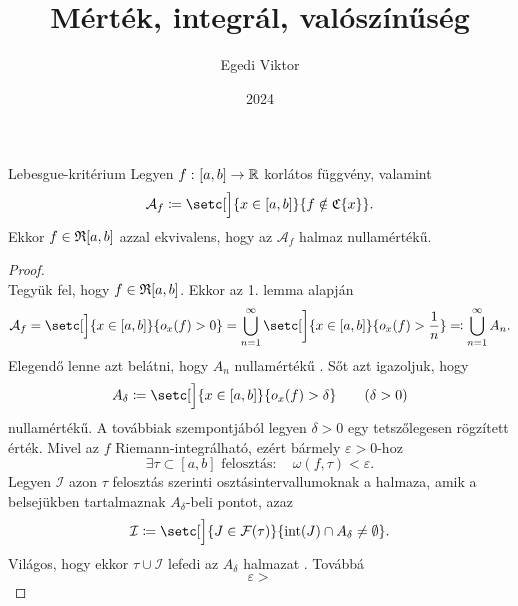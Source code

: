 \documentclass[
]{elteikthesis}[2024/04/26]
\title{Mérték, integrál, valószínűség} %
\date{2024} %
\author{Egedi Viktor}
\affiliation{egyetemi tanár} %
\begin{document}
	
	
	\begin{theorem}{Lebesgue-kritérium}{}
		Legyen \( f \,\colon [a, b] \to \mathbb{R} \) korlátos függvény, valamint
		\[
			\mathcal{A}_f \coloneq \setc[\Big]{ x \in [a, b] }{ f \notin \ContAt{x} }.
		\]
		Ekkor \( f \in \mathfrak{R}{[a, b]} \) azzal ekvivalens, 
		hogy az \( \mathcal{A}_f \) halmaz nullamértékű.
	\end{theorem}
	\begin{proof}\,\\[6pt]
		\Ifstep
		Tegyük fel, hogy \( f \in \mathfrak{R}{[a,b]} \). Ekkor az 1. lemma alapján
		\[
			\mathcal{A}_f = 
			\setc[\Big]{ x \in [a, b] }{ o_x(f) > 0 } =
			\bigcup_{n = 1}^{\infty} \setc[\bigg]{ x \in [a, b] }{ o_x(f) > \frac{1}{n} }
			\eqcolon \bigcup_{n = 1}^{\infty} A_n.
		\]
		Elegendő lenne azt belátni, hogy \( A_n \) nullamértékű%
		.
		Sőt azt igazoljuk, hogy
		\[
			A_\delta \coloneq \setc[\Big]{ x \in [a, b] }{ o_x(f) > \delta }
			\qquad (\delta > 0)
		\]
		nullamértékű. 
		A továbbiak szempontjából legyen \( \delta > 0 \) egy tetszőlegesen rögzített érték.
		Mivel az \( f \) Riemann-integrálható, ezért bármely \( \varepsilon > 0 \)-hoz
		\[
			\exists \tau \subset [a, b] \text{ felosztás} \colon \quad
			\omega(f, \tau) < \varepsilon.
		\]
		Legyen \( \mathcal{I} \) azon \( \tau \) felosztás szerinti osztásintervallumoknak a halmaza, amik a belsejükben tartalmaznak \( A_\delta \)-beli pontot, azaz
		\[
			\mathcal{I} \coloneq
			\setc[\Big]{ J \in \mathcal{F}(\tau) }{ \inter(J) \cap A_\delta \neq \emptyset }.
		\]
		Világos, hogy ekkor \( \tau \cup \mathcal{I} \) lefedi az \( A_\delta \) halmazat%
		.
		Továbbá
		\[
			\varepsilon	>
\]
\end{proof}
\end{document}
